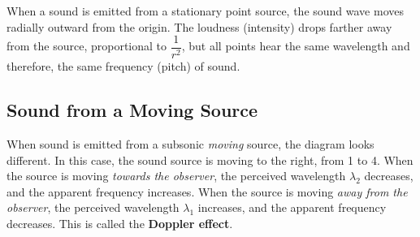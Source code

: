 When a sound is emitted from a stationary point source, the sound wave moves
radially outward from the origin. The loudness (intensity) drops farther away
from the source, proportional to $\dfrac1{r^2}$, but all points hear the same
wavelength and therefore, the same frequency (pitch) of sound.
\begin{figure}[ht]
  \centering
\end{figure}




\subsection{Sound from a Moving Source}

When sound is emitted from a subsonic \emph{moving} source, the diagram looks
different. In this case, the sound source is moving to the right,
from 1 to 4. When the source is moving \emph{towards the observer}, the
perceived wavelength $\lambda_2$ decreases, and the apparent frequency
increases. When the source is moving \emph{away from the observer}, the
perceived wavelength $\lambda_1$ increases, and the apparent frequency
decreases. This is called the \textbf{Doppler effect}.
\begin{figure}[ht]
  \centering
\end{figure}     

